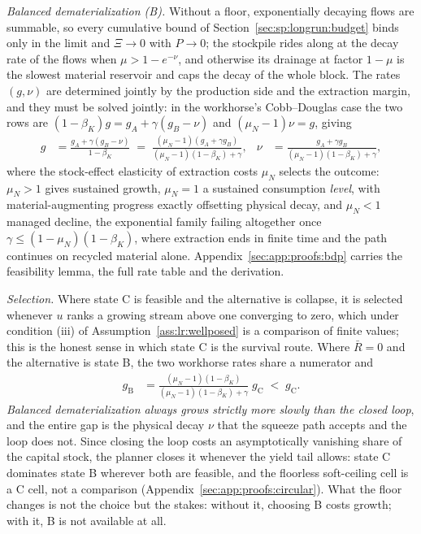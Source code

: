 \emph{Balanced dematerialization (B).} Without a floor, exponentially decaying flows are summable, so every cumulative bound of Section~\ref{sec:sp:longrun:budget} binds only in the limit and $\Xi\to0$ with $P\to0$; the stockpile rides along at the decay rate of the flows when $\mu>1-e^{-\nu}$, and otherwise its drainage at factor $1-\mu$ is the slowest material reservoir and caps the decay of the whole block. The rates $\left(g,\nu\right)$ are determined jointly by the production side and the extraction margin, and they must be solved jointly: in the workhorse's Cobb--Douglas case the two rows are $\left(1-\beta_K\right)g=g_A+\gamma\left(g_B-\nu\right)$ and $\left(\mu_N-1\right)\nu=g$, giving
\begin{align}
g &= \frac{g_A+\gamma\left(g_B-\nu\right)}{1-\beta_K}
\;=\;\frac{\left(\mu_N-1\right)\left(g_A+\gamma g_B\right)}{\left(\mu_N-1\right)\left(1-\beta_K\right)+\gamma},
&
\nu &= \frac{g_A+\gamma g_B}{\left(\mu_N-1\right)\left(1-\beta_K\right)+\gamma} ,
\label{eq:sp:lr:bdp-growth}
\end{align}
where the stock-effect elasticity of extraction costs $\mu_N$ selects the outcome: $\mu_N>1$ gives sustained growth, $\mu_N=1$ a sustained consumption \emph{level}, with material-augmenting progress exactly offsetting physical decay, and $\mu_N<1$ managed decline, the exponential family failing altogether once $\gamma\le\left(1-\mu_N\right)\left(1-\beta_K\right)$, where extraction ends in finite time and the path continues on recycled material alone. Appendix~\ref{sec:app:proofs:bdp} carries the feasibility lemma, the full rate table and the derivation.

\emph{Selection.} Where state C is feasible and the alternative is collapse, it is selected whenever $u$ ranks a growing stream above one converging to zero, which under condition (iii) of Assumption~\ref{ass:lr:wellposed} is a comparison of finite values; this is the honest sense in which state C is the survival route. Where $\bar R=0$ and the alternative is state B, the two workhorse rates share a numerator and
\begin{align}
g_{\mathrm{B}} &= \frac{\left(\mu_N-1\right)\left(1-\beta_K\right)}{\left(\mu_N-1\right)\left(1-\beta_K\right)+\gamma}\;g_{\mathrm{C}}\;<\;g_{\mathrm{C}} .
\label{eq:sp:lr:bdp-vs-c}
\end{align}
\emph{Balanced dematerialization always grows strictly more slowly than the closed loop}, and the entire gap is the physical decay $\nu$ that the squeeze path accepts and the loop does not. Since closing the loop costs an asymptotically vanishing share of the capital stock, the planner closes it whenever the yield tail allows: state C dominates state B wherever both are feasible, and the floorless soft-ceiling cell is a C cell, not a comparison (Appendix~\ref{sec:app:proofs:circular}). What the floor changes is not the choice but the stakes: without it, choosing B costs growth; with it, B is not available at all.

